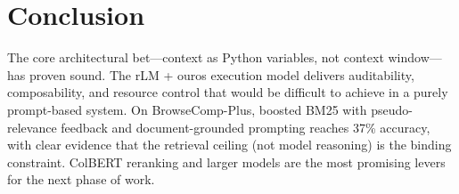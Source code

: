 \documentclass[11pt,a4paper]{article}
\begin{document}
\section{Conclusion}

The core architectural bet---context as Python variables, not context
window---has proven sound. The rLM + ouros execution model delivers
auditability, composability, and resource control that would be difficult to
achieve in a purely prompt-based system. On BrowseComp-Plus, boosted BM25 with
pseudo-relevance feedback and document-grounded prompting reaches 37\%
accuracy, with clear evidence that the retrieval ceiling (not model reasoning)
is the binding constraint. ColBERT reranking and larger models are the most
promising levers for the next phase of work.
\end{document}
